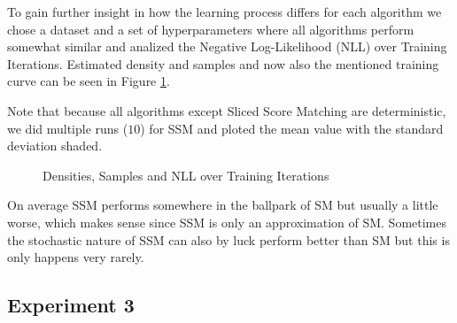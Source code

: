 To gain further insight in how the learning process differs for each algorithm we chose a dataset and a set of hyperparameters
where all algorithms perform somewhat similar and analized the Negative Log-Likelihood (NLL) over Training Iterations. 
Estimated density and samples and now also the mentioned training curve can be seen in Figure \ref{fig:halfmoons_10_logp}.

Note that because all algorithms except Sliced Score Matching are deterministic, we did multiple runs ($10$) for SSM and ploted the mean value 
with the standard deviation shaded. 

\begin{figure}[H]
    \centering
    \caption{Densities, Samples and NLL over Training Iterations}
    \label{fig:halfmoons_10_logp}
\end{figure}

On average SSM performs somewhere in the ballpark of SM but usually a little worse, which 
makes sense since SSM is only an approximation of SM. Sometimes the stochastic nature of SSM can also 
by luck perform better than SM but this is only happens very rarely. 

\subsection{Experiment 3}
\label{sec:2d_exp3}

